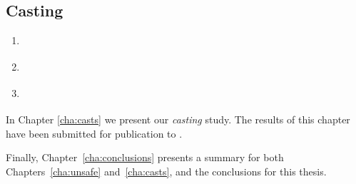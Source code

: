 \subsection*{Casting}

\begin{enumerate}[label=$RQ/C\arabic*:$,leftmargin=3.4\parindent]
\item {\bf \crqA} \crqAdesc{}
\item {\bf \crqB} \crqBdesc{}
\item {\bf \crqC} \crqCdesc{}
\end{enumerate}

In Chapter \ref{cha:casts} we present our \emph{casting} study.
The results of this chapter have been submitted for publication to .

Finally, Chapter~\ref{cha:conclusions} presents 
a summary for both Chapters~\ref{cha:unsafe} and~\ref{cha:casts}, and
the conclusions for this thesis.
